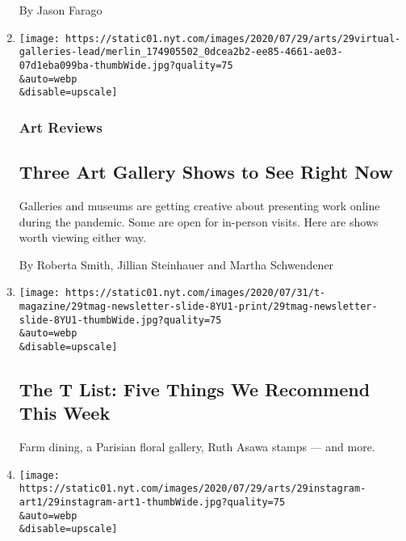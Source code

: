 \begin{enumerate}
  By Jason Farago
\item
  \href{/2020/07/30/arts/design/virtual-art-gallery-shows.html}{}

  \texttt{[image: https://static01.nyt.com/images/2020/07/29/arts/29virtual-galleries-lead/merlin\_174905502\_0dcea2b2-ee85-4661-ae03-07d1eba099ba-thumbWide.jpg?quality=75\\\&auto=webp\\\&disable=upscale]}

  \hypertarget{art-reviews}{%
  \subsubsection{Art Reviews}\label{art-reviews}}

  \hypertarget{three-art-gallery-shows-to-see-right-now}{%
  \subsection{Three Art Gallery Shows to See Right
  Now}\label{three-art-gallery-shows-to-see-right-now}}

  Galleries and museums are getting creative about presenting work
  online during the pandemic. Some are open for in-person visits. Here
  are shows worth viewing either way.

  By Roberta Smith, Jillian Steinhauer and Martha Schwendener
\item
  \href{/2020/07/30/t-magazine/the-t-list-five-things-we-recommend-this-week.html}{}

  \texttt{[image: https://static01.nyt.com/images/2020/07/31/t-magazine/29tmag-newsletter-slide-8YU1-print/29tmag-newsletter-slide-8YU1-thumbWide.jpg?quality=75\\\&auto=webp\\\&disable=upscale]}

  \hypertarget{the-t-list-five-things-we-recommend-this-week}{%
  \subsection{The T List: Five Things We Recommend This
  Week}\label{the-t-list-five-things-we-recommend-this-week}}

  Farm dining, a Parisian floral gallery, Ruth Asawa stamps --- and
  more.
\item
  \href{/2020/07/29/arts/design/art-accounts-to-follow-instagram.html}{}

  \texttt{[image: https://static01.nyt.com/images/2020/07/29/arts/29instagram-art1/29instagram-art1-thumbWide.jpg?quality=75\\\&auto=webp\\\&disable=upscale]}

  \hypertarget{five-art-accounts-to-follow-on-instagram-now}{%
}
\end{enumerate}
